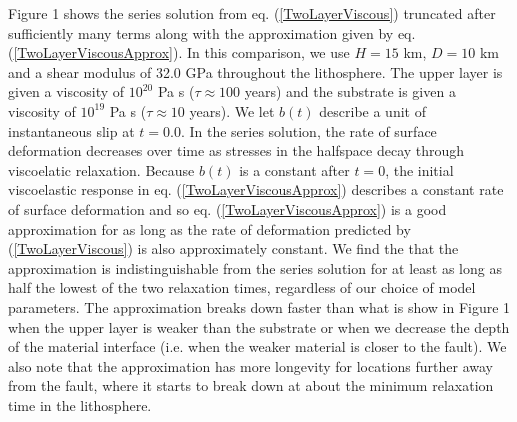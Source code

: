 \documentclass[extra]{gji}
\begin{document}
Figure 1 shows the series solution from eq. (\ref{TwoLayerViscous})
truncated after sufficiently many terms along with the approximation
given by eq. (\ref{TwoLayerViscousApprox}). In this comparison, we use
$H=15$ km, $D=10$ km and a shear modulus of 32.0 GPa throughout the
lithosphere.  The upper layer is given a viscosity of $10^{20}$ Pa s
($\tau\approx 100$ years) and the substrate is given a viscosity of
$10^{19}$ Pa s ($\tau\approx 10$ years).  We let $b(t)$ describe a unit
of instantaneous slip at $t=0.0$.  In the series solution, the rate of
surface deformation decreases over time as stresses in the halfspace
decay through viscoelatic relaxation.  Because $b(t)$ is a constant
after $t=0$, the initial viscoelastic response in
eq. (\ref{TwoLayerViscousApprox}) describes a constant rate of
surface deformation and so eq. (\ref{TwoLayerViscousApprox}) is a good
approximation for as long as the rate of deformation predicted by
(\ref{TwoLayerViscous}) is also approximately constant. We find the
that the approximation is indistinguishable from the series solution
for at least as long as half the lowest of the two relaxation times,
regardless of our choice of model parameters.  The approximation
breaks down faster than what is show in Figure 1 when the upper layer
is weaker than the substrate or when we decrease the depth of the
material interface (i.e. when the weaker material is closer to the
fault).  We also note that the approximation has more longevity for
locations further away from the fault, where it starts to break down
at about the minimum relaxation time in the lithosphere.
\end{document}
